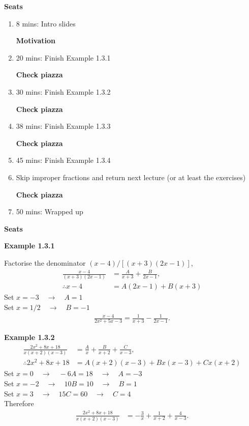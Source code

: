 \textbf{Seats}
\begin{enumerate}
    \item 8 mins: Intro slides \par
    \textbf{Motivation}
    \item 20 mins: Finish Example 1.3.1 \par
    \textbf{Check piazza}
    \item 30 mins: Finish Example 1.3.2 \par
    \textbf{Check piazza}
    \item 38 mins: Finish Example 1.3.3 \par
    \textbf{Check piazza}
    \item 45 mins: Finish Example 1.3.4 \par 
    \item Skip improper fractions and return next lecture (or at least the exercises) \par
    \textbf{Check piazza}
    \item 50 mins: Wrapped up
\end{enumerate}
\textbf{Seats}

\vspace{10mm}
\textbf{Example 1.3.1}

Factorise the denominator $(x - 4)/[(x+3)(2x-1)]$,
\begin{align*}
    \frac{x - 4}{(x+3)(2x-1)} &= \frac{A}{x+3} + \frac{B}{2x-1},\\
    \therefore x-4 &= A(2x-1) + B(x+3)
\end{align*}
Set $x=-3 \quad \rightarrow \quad A = 1$\\
Set $x=1/2 \quad \rightarrow \quad B = -1$
\begin{align*}
    \frac{x-4}{2x^2+5x-3} = \frac{1}{x+3} - \frac{1}{2x-1}.
\end{align*}

\vspace{10mm}
\textbf{Example 1.3.2}
\begin{align*}
    \frac{2x^2+8x+18}{x(x+2)(x-3)} &= \frac{A}{x} + \frac{B}{x+2} + \frac{C}{x-3},\\
    \therefore 2x^2+8x+18 &= A(x+2)(x-3) + Bx(x-3) + Cx(x+2)
\end{align*}
Set $x=0 \quad \rightarrow \quad -6A=18 \quad \rightarrow \quad A=-3$\\
Set $x=-2 \quad \rightarrow \quad 10B=10 \quad \rightarrow \quad B=1$\\
Set $x=3 \quad \rightarrow \quad 15C=60 \quad \rightarrow \quad C=4$\\
Therefore
\begin{align*}
    \frac{2x^2+8x+18}{x(x+2)(x-3)} &= -\frac{3}{x} + \frac{1}{x+2} + \frac{4}{x-3}.
\end{align*}


